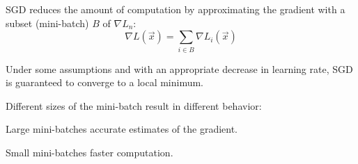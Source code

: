 SGD reduces the amount of computation by approximating the gradient with a subset (mini-batch) $B$ of $\nabla L_n$:
\[ \nabla L(\vec{x}) = \sum_{i \in B} \nabla L_i(\vec{x}) \]

\begin{theorem}
    Under some assumptions and with an appropriate decrease in learning rate, 
    SGD is guaranteed to converge to a local minimum.
\end{theorem}

Different sizes of the mini-batch result in different behavior:
\begin{descriptionlist}
    \item[Large mini-batches] accurate estimates of the gradient.
    \item[Small mini-batches] faster computation.
\end{descriptionlist}